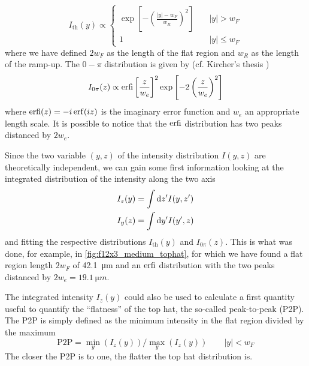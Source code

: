 \begin{equation}
    I_\text{th}(y) \propto
    \begin{cases}
        \exp\left[-\left(\frac{\left|y\right|-w_F}{w_R}\right)^2\right] & \quad |y| > w_F    \\
        1                                                               & \quad |y| \leq w_F
    \end{cases}
\end{equation}
where we have defined $2w_F$ as the length of the flat region and $w_R$ as the length of the ramp-up. The $0-\pi$ distribution is given by (cf. Kircher's thesis \cite{krinner2015})
\begin{equation}
    \label{eq:erfi}
    I_{0\pi}(z) \propto  \text{erfi}\left[\frac{z}{w_e}\right]^2 \exp\left[-2 \left(\frac{z}{w_e}\right)^2\right]
\end{equation}
where $\erfi(z) = -i\erf(iz)$ is the imaginary error function and $w_e$ an appropriate length scale. It is possible to notice that the $\text{erfi}$ distribution has two peaks distanced by $2w_e$.

Since the two variable $(y,z)$ of the intensity distribution $I(y,z)$ are theoretically independent, we can gain some first information looking at the integrated distribution of the intensity along the two axis
\begin{align}
    I_z(y) & = \int \differential z' I(y,z') \\
    I_y(z) & = \int \differential y' I(y',z)
\end{align}
and fitting the respective distributions $I_\text{th}(y)$ and $I_{0\pi}(z)$. This is what was done, for example, in \cref{fig:f12x3_medium_tophat}, for which we have found a flat region length $2w_F$ of \SI{42.1}{\micro m} and an $\text{erfi}$ distribution with the two peaks distanced by $2w_e = \SI{19.1}{\micro m}$.

The integrated intensity $I_z(y)$ could also be used to calculate a first quantity useful to quantify the \enquote{flatness} of the top hat, the so-called peak-to-peak (P2P). The P2P is simply defined as the minimum intensity in the flat region divided by the maximum
\begin{equation}
    \label{eq:p2p}
    \text{P2P} = \min_y(I_z(y)) / \max_y(I_z(y)) \qquad |y| < w_F
\end{equation}
The closer the P2P is to one, the flatter the top hat distribution is.

